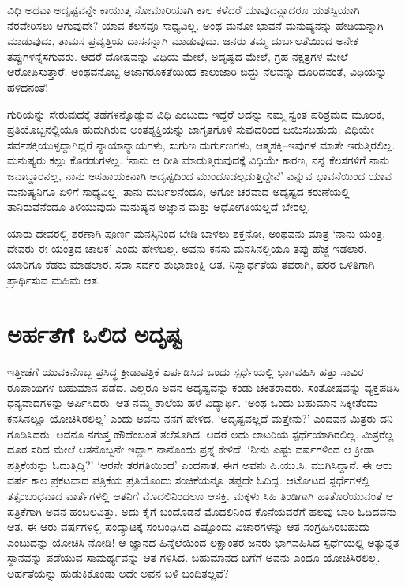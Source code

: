 ವಿಧಿ ಅಥವಾ ಅದೃಷ್ಟವನ್ನೇ ಕಾಯುತ್ತ ಸೋಮಾರಿಯಾಗಿ ಕಾಲ ಕಳೆದರೆ ಯಾವುದನ್ನಾದರೂ ಯಶಸ್ವಿಯಾಗಿ ನೆರವೇರಿಸಲು ಆಗುವುದೇ? ಯಾವ ಕೆಲಸವೂ ಸಾಧ್ಯವಿಲ್ಲ. ಅಂಥ ಮನೋ ಭಾವನೆ ಮನುಷ್ಯನನ್ನು ಹೇಡಿಯನ್ನಾಗಿ ಮಾಡುವುದು, ತಾಮಸ ಪ್ರವೃತ್ತಿಯ ದಾಸನನ್ನಾಗಿ ಮಾಡುವುದು. ಜನರು ತಮ್ಮ ದುರ್ಬಲತೆಯಿಂದ ಅನೇಕ ತಪ್ಪುಗಳನ್ನೆಸಗುವರು. ಆದರೆ ದೋಷವನ್ನು ವಿಧಿಯ ಮೇಲೆ, ಅದೃಷ್ಟದ ಮೇಲೆ, ಗ್ರಹ ನಕ್ಷತ್ರಗಳ ಮೇಲೆ ಆರೋಪಿಸುತ್ತಾರೆ. ಅಂಥವನೊಬ್ಬ ಅಜಾಗರೂಕತೆಯಿಂದ ಕಾಲುಜಾರಿ ಬಿದ್ದು ನೆಲವನ್ನು ದೂರಿದನಂತೆ, ವಿಧಿಯನ್ನು ಹಳಿದನಂತೆ!

ಗುರಿಯನ್ನು ಸೇರುವುದಕ್ಕೆ ತಡೆಗಳನ್ನೊಡ್ಡುವ ವಿಧಿ ಎಂಬುದು ಇದ್ದರೆ ಅದನ್ನು ನಮ್ಮ ಸ್ವಂತ ಪರಿಶ್ರಮದ ಮೂಲಕ, ಪ್ರತಿಯೊಬ್ಬನಲ್ಲಿಯೂ ಹುದುಗಿರುವ ಅಂತಶ್ಶಕ್ತಿಯನ್ನು ಜಾಗೃತಗೊಳಿ ಸುವುದರಿಂದ ಜಯಿಸಬಹುದು. ವಿಧಿಯೇ ಸರ್ವಶಕ್ತಿಯುಳ್ಳದ್ದಾಗಿದ್ದರೆ ನ್ಯಾಯಾನ್ಯಾಯಗಳು, ಸುಗುಣ ದುರ್ಗುಣಗಳು, ಆತ್ಮಶಕ್ತಿ–ಇವುಗಳ ಮಾತೇ ಇರುತ್ತಿರಲಿಲ್ಲ. ಮನುಷ್ಯರು ಕಲ್ಲು ಕೊರಡುಗಳಲ್ಲ. ‘ನಾನು ಆ ರೀತಿ ಮಾಡುತ್ತಿರುವುದಕ್ಕೆ ವಿಧಿಯೇ ಕಾರಣ, ನನ್ನ ಕೆಲಸಗಳಿಗೆ ನಾನು ಜವಾಬ್ದಾರನಲ್ಲ, ನಾನು ಅಸಹಾಯಕನಾಗಿ ಅದೃಷ್ಟದಿಂದ ಮುಂದೂಡಲ್ಪಡುತ್ತಿದ್ದೇನೆ’ ಎನ್ನುವ ಭಾವನೆಯಿಂದ ಯಾವ ಮನುಷ್ಯನಿಗೂ ಏಳಿಗೆ ಸಾಧ್ಯವಿಲ್ಲ. ತಾನು ದುರ್ಬಲನೆಂದೂ, ಅಗೋ ಚರವಾದ ಅದೃಷ್ಟದ ಕರುಣೆಯಲ್ಲಿ ತಾನಿರುವೆನೆಂದೂ ತಿಳಿಯುವುದು ಮನುಷ್ಯನ ಅಜ್ಞಾನ ಮತ್ತು ಅಧೋಗತಿಯಲ್ಲದೆ ಬೇರಲ್ಲ.

ಯಾರು ದೇವರಲ್ಲಿ ಶರಣಾಗಿ ಪೂರ್ಣ ಮನಸ್ಸಿನಿಂದ ಬೇಡಿ ಬಾಳಲು ಶಕ್ತನೋ, ಅಂಥವನು ಮಾತ್ರ ‘ನಾನು ಯಂತ್ರ, ದೇವರು ಈ ಯಂತ್ರದ ಚಾಲಕ’ ಎಂದು ಹೇಳಬಲ್ಲ. ಅವನು ಕನಸು ಮನಸಿನಲ್ಲಿಯೂ ತಪ್ಪು ಹೆಜ್ಜೆ ಇಡಲಾರ. ಯಾರಿಗೂ ಕೆಡಕು ಮಾಡಲಾರ. ಸದಾ ಸರ್ವರ ಶುಭಾಕಾಂಕ್ಷಿ ಆತ. ನಿಸ್ವಾರ್ಥತೆಯ ತವರಾಗಿ, ಪರರ ಒಳಿತಿಗಾಗಿ ಪ್ರಾರ್ಥಿಸುವ ಮಹಿಮ ಆತ.


\section*{ಅರ್ಹತೆಗೆ ಒಲಿದ ಅದೃಷ್ಟ}


ಇತ್ತೀಚೆಗೆ ಯುವಕನೊಬ್ಬ ಪ್ರಸಿದ್ಧ ಕ್ರೀಡಾಪತ್ರಿಕೆ ಏರ್ಪಡಿಸಿದ ಒಂದು ಸ್ಪರ್ಧೆಯಲ್ಲಿ ಭಾಗವಹಿಸಿ ಹತ್ತು ಸಾವಿರ ರೂಪಾಯಿಗಳ ಬಹುಮಾನ ಪಡೆದ. ಎಲ್ಲರೂ ಅವನ ಅದೃಷ್ಟವನ್ನು ಕಂಡು ಚಕಿತ\-ರಾದರು. ಸಂತೋಷವನ್ನು ವ್ಯಕ್ತಪಡಿಸಿ ಧನ್ಯವಾದಗಳನ್ನು ಅರ್ಪಿಸಿದರು. ಆತ ನಮ್ಮ ಶಾಲೆಯ ಹಳೆ ವಿದ್ಯಾರ್ಥಿ. ‘ಅಂಥ ಒಂದು ಬಹುಮಾನ ಸಿಕ್ಕೀತೆಂದು ಕನಸಿನಲ್ಲೂ ಯೋಚಿಸಿರಲಿಲ್ಲ’ ಎಂದು ಅವನು ನನಗೆ ಹೇಳಿದ. ‘ಅದೃಷ್ಟವಲ್ಲದೆ ಮತ್ತೇನು?’ ಎಂದವನ ಮಿತ್ರರು ದನಿ ಗೂಡಿಸಿದರು. ಅವನೂ ನಗುತ್ತ ಹೌದೆಂಬಂತೆ ತಲೆತೂಗಿದ. ಆದರೆ ಅದು ಲಾಟರಿಯ ಸ್ಪರ್ಧೆಯಾಗಿರಲಿಲ್ಲ. ಮಿತ್ರರೆಲ್ಲ ದೂರ ಸರಿದ ಮೇಲೆ ಆತನೊಬ್ಬನೇ ಇದ್ದಾಗ ನಾನೊಂದು ಪ್ರಶ್ನೆ ಕೇಳಿದೆ. ‘ನೀನು ಎಷ್ಟು ವರ್ಷಗಳಿಂದ ಆ ಕ್ರೀಡಾ ಪತ್ರಿಕೆಯನ್ನು ಓದುತ್ತಿದ್ದಿ?’ ‘ಆರನೇ ತರಗತಿಯಿಂದ’ ಎಂದನಾತ. ಈಗ ಅವನು ಪಿ.ಯು.ಸಿ. ಮುಗಿಸಿದ್ದಾನೆ. ಈ ಆರು ವರ್ಷ ಕಾಲ ಪ್ರಕಟವಾದ ಪತ್ರಿಕೆಯ ಪ್ರತಿಯೊಂದು ಸಂಚಿಕೆಯನ್ನೂ ತಪ್ಪದೇ ಓದಿದ್ದ. ಆಟೋಟದ ಸ್ಪರ್ಧೆಗಳಲ್ಲಿ ತತ್ಸಂಬಂಧವಾದ ವಾರ್ತೆಗಳಲ್ಲಿ ಆತನಿಗೆ ಮೊದಲಿನಿಂದಲೂ ಆಸಕ್ತಿ. ಮಕ್ಕಳು ಸಿಹಿ ತಿಂಡಿಗಾಗಿ ಹಾತೊರೆಯುವಂತೆ ಆ ಪತ್ರಿಕೆಗಾಗಿ ಅವನ ಹಂಬಲವಿತ್ತು. ಅದು ಕೈಗೆ ಬಂದೊಡನೆ ಮೊದಲಿನಿಂದ ಕೊನೆಯವರೆಗೆ ಹಲವು ಬಾರಿ ಓದಿದವನು ಆತ. ಈ ಆರು ವರ್ಷಗಳಲ್ಲಿ ಪಂದ್ಯಾಟಕ್ಕೆ ಸಂಬಂಧಿಸಿದ ಎಷ್ಟೊಂದು ವಿಚಾರಗಳನ್ನು ಆತ ಸಂಗ್ರಹಿಸಿರಬಹುದು ಎಂಬುದನ್ನು ಯೋಚಿಸಿ ನೋಡಿ! ಆ ಜ್ಞಾನದ ಹಿನ್ನೆಲೆಯಿಂದ ಲಕ್ಷಾಂತರ ಜನರು ಭಾಗವಹಿಸಿದ ಸ್ಪರ್ಧೆಯಲ್ಲಿ ಅತ್ಯುನ್ನತ ಸ್ಥಾನವನ್ನು ಪಡೆಯುವ ಸಾಮರ್ಥ್ಯವನ್ನು ಆತ ಗಳಿಸಿದ. ಬಹುಮಾನದ ಬಗೆಗೆ ಅವನು ಎಂದೂ ಯೋಚಿಸಿರಲಿಲ್ಲ. ಅರ್ಹತೆಯನ್ನು ಹುಡುಕಿಕೊಂಡು ಅದೇ ಅವನ ಬಳಿ ಬಂದಿತಲ್ಲವೆ?



